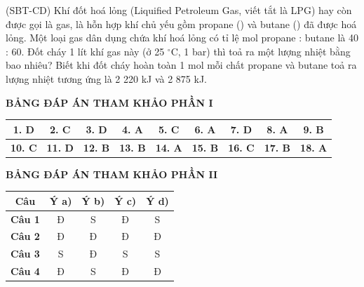 \documentclass[12pt,a4paper]{article}
\begin{document}
\begin{ex}
(SBT-CD) Khí đốt hoá lỏng (Liquified Petroleum Gas, viết tắt là LPG) hay còn được gọi là gas, là hỗn hợp khí chủ yếu gồm propane () và butane () đã được hoá lỏng. Một loại gas dân dụng chứa khí hoá lỏng có tỉ lệ mol propane : butane là 40 : 60. Đốt cháy 1 lít khí gas này (ở 25 $^\circ\text{C}$, 1 bar) thì toả ra một lượng nhiệt bằng bao nhiêu? Biết khi đốt cháy hoàn toàn 1 mol mỗi chất propane và butane toả ra lượng nhiệt tương ứng là 2 220 kJ và 2 875 kJ.


\end{ex}

\newpage
\noindent\textbf{\large BẢNG ĐÁP ÁN THAM KHẢO PHẦN I}
\vspace{0.2cm}

\begin{center}
\begin{tabular}{|c|c|c|c|c|c|c|c|c|}
\hline
\textbf{1. D} & \textbf{2. C} & \textbf{3. D} & \textbf{4. A} & \textbf{5. C} & \textbf{6. A} & \textbf{7. D} & \textbf{8. A} & \textbf{9. B} \\
\hline
\textbf{10. C} & \textbf{11. D} & \textbf{12. B} & \textbf{13. B} & \textbf{14. A} & \textbf{15. B} & \textbf{16. C} & \textbf{17. B} & \textbf{18. A} \\
\hline
\end{tabular}
\end{center}

\bigskip
\noindent\textbf{\large BẢNG ĐÁP ÁN THAM KHẢO PHẦN II}
\vspace{0.2cm}

\begin{center}
\begin{tabular}{|c|c|c|c|c|}
\hline
\textbf{Câu} & \textbf{Ý a)} & \textbf{Ý b)} & \textbf{Ý c)} & \textbf{Ý d)} \\
\hline
\textbf{Câu 1} & Đ & S & Đ & S \\
\hline
\textbf{Câu 2} & Đ & Đ & Đ & Đ \\
\hline
\textbf{Câu 3} & S & Đ & S & S \\
\hline
\textbf{Câu 4} & Đ & S & Đ & Đ \\
\hline
\end{tabular}
\end{center}
\end{document}
